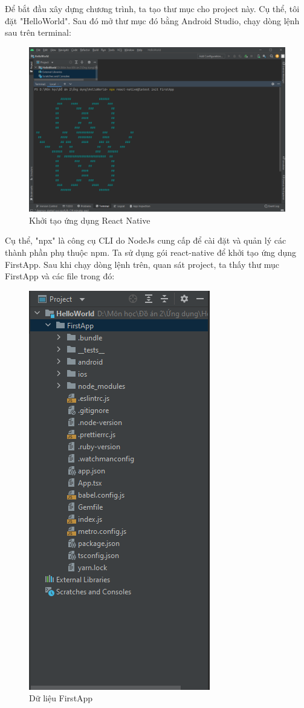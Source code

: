 Để bắt đầu xây dựng chương trình, ta tạo thư mục cho project này. Cụ thể, tôi đặt "HelloWorld". Sau đó mở thư mục đó bằng Android Studio, chạy dòng lệnh sau trên terminal:
\begin{figure}[!ht]
    \centering
    \includegraphics[width=1\textwidth]{images/createFirstApp.png}
    \caption{Khởi tạo ứng dụng React Native}
\end{figure}

Cụ thể, "npx" là công cụ CLI do NodeJs cung cấp để cài đặt và quản lý các thành phần phụ thuộc npm. Ta sử dụng gói react-native để khởi tạo ứng dụng FirstApp.
Sau khi chạy dòng lệnh trên, quan sát project, ta thấy thư mục FirstApp và các file trong đó:
\begin{figure}[!ht]
    \centering
    \includegraphics[scale=0.5]{images/firstAppData.png}
    \caption{Dữ liệu FirstApp}
\end{figure}

